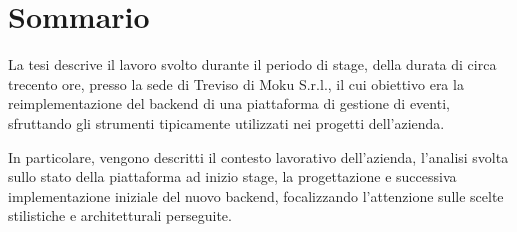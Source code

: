 \cleardoublepage
{}
{}
\begingroup
\let\clearpage\relax
\let\cleardoublepage\relax
\let\cleardoublepage\relax

\chapter*{Sommario}
La tesi descrive il lavoro svolto durante il periodo di stage, della durata di circa trecento ore, presso la sede di Treviso di Moku S.r.l., il cui obiettivo era la reimplementazione del backend di una piattaforma di gestione di eventi, sfruttando gli strumenti tipicamente utilizzati nei progetti dell'azienda.

In particolare, vengono descritti il contesto lavorativo dell'azienda, l'analisi svolta sullo stato della piattaforma ad inizio stage, la progettazione e successiva implementazione iniziale del nuovo backend, focalizzando l'attenzione sulle scelte stilistiche e architetturali perseguite.

%
%

\endgroup			

\vfill
